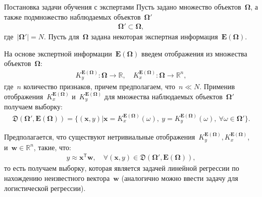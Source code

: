 \documentclass[9pt,pdf,hyperref={unicode}]{beamer}
\begin{document}
\begin{frame}{Постановка задачи обучения с экспертами}
\justifying
Пусть задано множество объектов~$\bm{\Omega}$, а также подмножество наблюдаемых объектов~$\bm{\Omega}'$
\begin{equation*}
\begin{aligned}
\bm{\Omega}'\subset\bm{\Omega},
\end{aligned}
\end{equation*}
где~$\left|\bm{\Omega}'\right|=N$.
Пусть для~$\bm{\Omega}$ задана некоторая экспертная информация~$\bm{E}\left(\bm{\Omega}\right)$.

На основе экспертной информации~$\bm{E}\left(\bm{\Omega}\right)$ введем отображения из множества объектов~$\bm{\Omega}$:
\begin{equation*}
\begin{aligned}
K_y^{\bm{E}\left(\bm{\Omega}\right)} :\bm{\Omega}\to \mathbb{R}, \quad K_x^{\bm{E}\left(\bm{\Omega}\right)} :\bm{\Omega}\to \mathbb{R}^{n},
\end{aligned}
\end{equation*}
где~$n$ количество признаков, причем предполагаем, что~$n\ll N$. Применив отображения~$K_x^{\bm{E}\left(\bm{\Omega}\right)}$ и~$K_y^{\bm{E}\left(\bm{\Omega}\right)}$ для множества наблюдаемых объектов~$\bm{\Omega}'$ получаем выборку:
\begin{equation*}
\begin{aligned}
\mathfrak{D}\left(\bm{\Omega}',\bm{E}\left(\bm{\Omega}\right)\right) = \{\left(\textbf{x}, y\right)|\textbf{x}=K_x^{\bm{E}\left(\bm{\Omega}\right)}\left(\omega\right),~y=K_y^{\bm{E}\left(\bm{\Omega}\right)}\left(\omega\right),~\forall \omega \in \bm{\Omega}'\}.
\end{aligned}
\end{equation*}

Предполагается, что существуют нетривиальные отображения~$K_y^{\bm{E}\left(\bm{\Omega}\right)}, K_x^{\bm{E}\left(\bm{\Omega}\right)}$, и~$\textbf{w}\in\mathbb{R}^{n}$, такие, что:
\begin{equation*}
\begin{aligned}
y \approx \textbf{x}^{\mathsf{T}}\textbf{w}, \quad \forall\left(\textbf{x}, y\right)\in\mathfrak{D}\left(\bm{\Omega}',\bm{E}\left(\bm{\Omega}\right)\right),
\end{aligned}
\end{equation*}
то есть получаем выборку, которая является задачей линейной регрессии по нахождению неизвестного вектора~$\textbf{w}$ (аналогично можно ввести задачу для логистической регрессии).

\end{frame}
\end{document}
